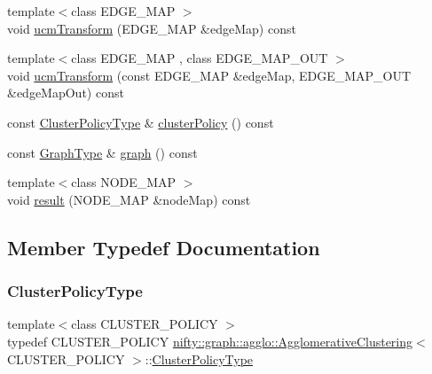 \begin{DoxyCompactItemize}
\item 
{\footnotesize template$<$class E\+D\+G\+E\+\_\+\+M\+AP $>$ }\\void \hyperlink{classnifty_1_1graph_1_1agglo_1_1AgglomerativeClustering_a7e9b9949000d96d91844ab2df1e28509}{ucm\+Transform} (E\+D\+G\+E\+\_\+\+M\+AP \&edge\+Map) const
\item 
{\footnotesize template$<$class E\+D\+G\+E\+\_\+\+M\+AP , class E\+D\+G\+E\+\_\+\+M\+A\+P\+\_\+\+O\+UT $>$ }\\void \hyperlink{classnifty_1_1graph_1_1agglo_1_1AgglomerativeClustering_a717660885100f4c0321c4e19fb536072}{ucm\+Transform} (const E\+D\+G\+E\+\_\+\+M\+AP \&edge\+Map, E\+D\+G\+E\+\_\+\+M\+A\+P\+\_\+\+O\+UT \&edge\+Map\+Out) const
\item 
const \hyperlink{classnifty_1_1graph_1_1agglo_1_1AgglomerativeClustering_a3a678ecd37725f2c0f8ec56857768034}{Cluster\+Policy\+Type} \& \hyperlink{classnifty_1_1graph_1_1agglo_1_1AgglomerativeClustering_a5e68685d164d4f6104bd40c29eca0c08}{cluster\+Policy} () const
\item 
const \hyperlink{classnifty_1_1graph_1_1agglo_1_1AgglomerativeClustering_a0c735105592b55c036be76e3d7fc735f}{Graph\+Type} \& \hyperlink{classnifty_1_1graph_1_1agglo_1_1AgglomerativeClustering_a4da52a342e866335a671879e8c4864d2}{graph} () const
\item 
{\footnotesize template$<$class N\+O\+D\+E\+\_\+\+M\+AP $>$ }\\void \hyperlink{classnifty_1_1graph_1_1agglo_1_1AgglomerativeClustering_afbe080ba596ae20f85404635c5f00d20}{result} (N\+O\+D\+E\+\_\+\+M\+AP \&node\+Map) const
\end{DoxyCompactItemize}


\subsection{Member Typedef Documentation}
\mbox{\label{classnifty_1_1graph_1_1agglo_1_1AgglomerativeClustering_a3a678ecd37725f2c0f8ec56857768034}} 
\subsubsection{\texorpdfstring{Cluster\+Policy\+Type}{ClusterPolicyType}}
{\footnotesize\ttfamily template$<$class C\+L\+U\+S\+T\+E\+R\+\_\+\+P\+O\+L\+I\+CY $>$ \\
typedef C\+L\+U\+S\+T\+E\+R\+\_\+\+P\+O\+L\+I\+CY \hyperlink{classnifty_1_1graph_1_1agglo_1_1AgglomerativeClustering}{nifty\+::graph\+::agglo\+::\+Agglomerative\+Clustering}$<$ C\+L\+U\+S\+T\+E\+R\+\_\+\+P\+O\+L\+I\+CY $>$\+::\hyperlink{classnifty_1_1graph_1_1agglo_1_1AgglomerativeClustering_a3a678ecd37725f2c0f8ec56857768034}{Cluster\+Policy\+Type}}

